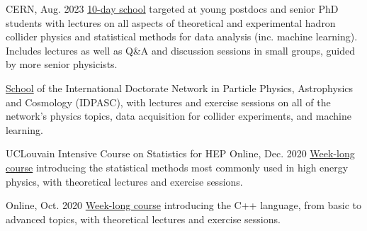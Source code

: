 
\begin{cventries}
    {}{CERN, Aug. 2023}
    {\href{https://indico.cern.ch/event/1234112/}{10-day school} targeted at young postdocs and senior PhD students with lectures on all aspects of theoretical and experimental hadron collider physics and statistical methods for data analysis (inc. machine learning). Includes lectures as well as Q\&A and discussion sessions in small groups, guided by more senior physicists.}\vspace*{2mm}

    {\href{https://indico.lip.pt/event/643}{School} of the International Doctorate Network in Particle Physics, Astrophysics and Cosmology (IDPASC), with lectures and exercise sessions on all of the network's physics topics, data acquisition for collider experiments, and machine learning.}\vspace*{2mm}
    
    \cventry
    {{UCLouvain Intensive Course on Statistics for HEP}}{}
    {}{Online, Dec. 2020}
    {\href{https://agenda.irmp.ucl.ac.be/event/4097/}{Week-long course} introducing the statistical methods most commonly used in high energy physics, with theoretical lectures and exercise sessions.}\vspace*{2mm}
    
    {}{Online, Oct. 2020}
    {\href{https://indico.cern.ch/event/946584}{Week-long course} introducing the C++ language, from basic to advanced topics, with theoretical lectures and exercise sessions.}\vspace*{2mm}

\end{cventries}

